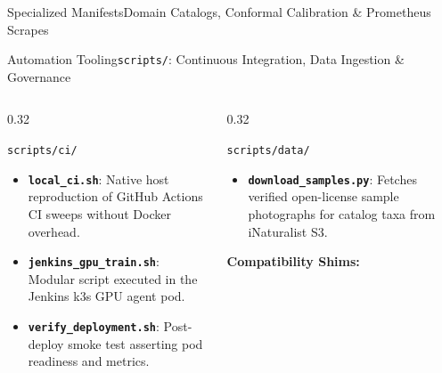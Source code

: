 \begin{frame}{Specialized Manifests}{Domain Catalogs, Conformal Calibration \& Prometheus Scrapes}
\end{frame}

\begin{frame}{Automation Tooling}{\texttt{scripts/}: Continuous Integration, Data Ingestion \& Governance}
    \begin{columns}[T]
        \begin{column}{0.32\textwidth}
            \begin{block}{\texttt{scripts/ci/}}
                \begin{itemize}\scriptsize
                    \item \textbf{\texttt{local\_ci.sh}}: Native host reproduction of GitHub Actions CI sweeps without Docker overhead.
                    \item \textbf{\texttt{jenkins\_gpu\_train.sh}}: Modular script executed in the Jenkins k3s GPU agent pod.
                    \item \textbf{\texttt{verify\_deployment.sh}}: Post-deploy smoke test asserting pod readiness and metrics.
                \end{itemize}
            \end{block}
        \end{column}
        \begin{column}{0.32\textwidth}
            \begin{block}{\texttt{scripts/data/}}
                \begin{itemize}\scriptsize
                    \item \textbf{\texttt{download\_samples.py}}: Fetches verified open-license sample photographs for catalog taxa from iNaturalist S3.
                \end{itemize}
                \vspace{0.2cm}
                \textbf{Compatibility Shims:}
                \begin{itemize}\scriptsize

\end{itemize}
\end{block}
\end{column}
\end{columns}
\end{frame}
